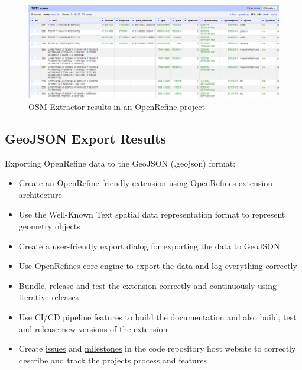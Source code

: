 \begin{figure}[H]
    \includegraphics[width=\linewidth]{./Figures/Results/osm_extractor_results}
    \caption{OSM Extractor results in an OpenRefine project}
\end{figure}
\subsection{GeoJSON Export Results}
Exporting OpenRefine data to the GeoJSON (.geojson) format:
\begin{itemize}
    \item Create an OpenRefine-friendly extension using OpenRefine\textquotesingle s extension architecture
    \item Use the Well-Known Text spatial data representation format to represent geometry objects
    \item Create a user-friendly export dialog for exporting the data to GeoJSON
    \item Use OpenRefine\textquotesingle s core engine to export the data and log everything correctly
    \item Bundle, release and test the extension correctly and continuously using iterative \href{https://gitlab.com/labiangashi/geojson-export/-/releases}{releases}
    \item Use CI/CD pipeline features to build the documentation and also build, test and \href{https://gitlab.com/labiangashi/geojson-export/-/releases}{release new versions} of the extension
    \item Create \href{https://gitlab.com/labiangashi/geojson-export/-/issues}{issues} and
    \href{https://gitlab.com/labiangashi/geojson-export/-/milestones}{milestones} in the code repository host website to correctly describe and
    track the project\textquotesingle s process and features
\end{itemize}
